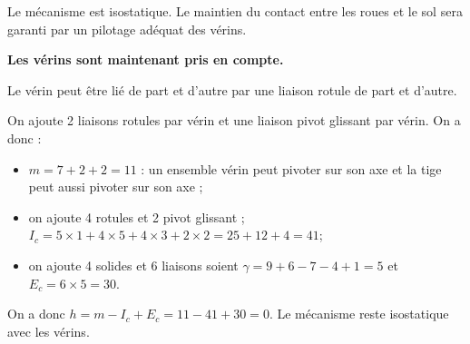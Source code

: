 \ifprof
\begin{corrige}
Le mécanisme est isostatique. Le maintien du contact entre les roues et le sol sera garanti par un pilotage adéquat des vérins.
\end{corrige}
\else\fi


\textbf{Les vérins sont maintenant pris en compte.}

\ifprof
\begin{corrige}
Le vérin peut être lié de part et d'autre par une liaison rotule de part et d'autre. 
\end{corrige}
\else\fi

\ifprof
\begin{corrige}
On ajoute 2 liaisons rotules par vérin et une liaison pivot glissant par vérin.
On a donc : 
\begin{itemize}
\item $m=7+2+2 = 11$ : un ensemble vérin peut pivoter sur son axe et la tige peut aussi pivoter sur son axe ;
\item on ajoute 4 rotules et 2 pivot glissant ; $I_c = 5\times 1 + 4\times 5+ 4\times 3+ 2\times 2 = 25+12+4 = 41 $;
\item on ajoute 4 solides et 6 liaisons soient $\gamma = 9+6-7-4+1 = 5$ et $E_c = 6\times 5 = 30$.
\end{itemize}
On a donc $h=m-I_c+E_c = 11 - 41 + 30 =0$. Le mécanisme reste isostatique avec les vérins. 
\end{corrige}
\else\fi
